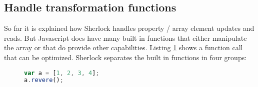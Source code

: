 \subsection{Handle transformation functions}

So far it is explained how Sherlock handles property / array element updates and reads. But Javascript does have many built in functions that either manipulate the array or that do provide other capabilities. Listing \ref{fig:array_function} shows a function call that can be optimized. Sherlock separates the built in functions in four groups:

\begin{figure}[htbp]
\begin{lstlisting}[language=Javascript]
var a = [1, 2, 3, 4];
a.revere();
\end{lstlisting}
\caption{}\label{fig:array_function}
\end{figure}

